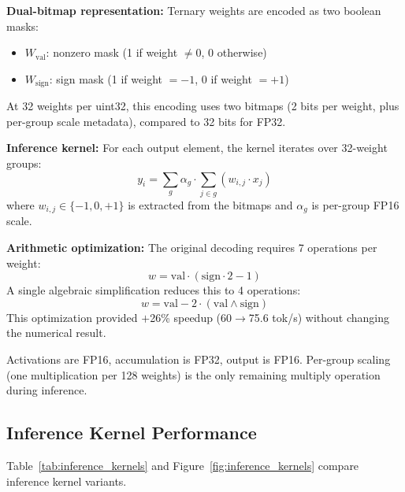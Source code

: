\documentclass{article}
\begin{document}
\textbf{Dual-bitmap representation:} Ternary weights are encoded as two boolean masks:
\begin{itemize}
\item $W_{\text{val}}$: nonzero mask (1 if weight $\neq 0$, 0 otherwise)
\item $W_{\text{sign}}$: sign mask (1 if weight $= -1$, 0 if weight $= +1$)
\end{itemize}
At 32 weights per uint32, this encoding uses two bitmaps (2 bits per weight, plus per-group scale metadata), compared to 32 bits for FP32.

\textbf{Inference kernel:} For each output element, the kernel iterates over 32-weight groups:
\begin{equation}
y_i = \sum_{g} \alpha_g \cdot \sum_{j \in g} (w_{i,j} \cdot x_j)
\end{equation}
where $w_{i,j} \in \{-1, 0, +1\}$ is extracted from the bitmaps and $\alpha_g$ is per-group FP16 scale.

\textbf{Arithmetic optimization:} The original decoding requires 7 operations per weight:
$$w = \text{val} \cdot (\text{sign} \cdot 2 - 1)$$
A single algebraic simplification reduces this to 4 operations:
\begin{equation}
w = \text{val} - 2 \cdot (\text{val} \wedge \text{sign})
\end{equation}
This optimization provided $+$26\% speedup (60$\to$75.6 tok/s) without changing the numerical result.

Activations are FP16, accumulation is FP32, output is FP16. Per-group scaling (one multiplication per 128 weights) is the only remaining multiply operation during inference.

\subsection{Inference Kernel Performance}

Table~\ref{tab:inference_kernels} and Figure~\ref{fig:inference_kernels} compare inference kernel variants.
\end{document}
